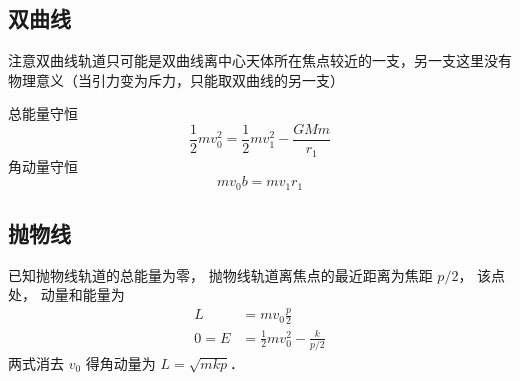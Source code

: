 \subsection{双曲线}
注意双曲线轨道只可能是双曲线离中心天体所在焦点较近的一支，另一支这里没有物理意义（当引力变为斥力，只能取双曲线的另一支）

总能量守恒
\begin{equation}
\frac12 mv_0^2 = \frac12 mv_1^2 - \frac{GMm}{r_1}
\end{equation}
角动量守恒
\begin{equation}
m v_0 b = m v_1 r_1
\end{equation}

\subsection{抛物线}
已知抛物线轨道的总能量为零， 抛物线轨道离焦点的最近距离为焦距 $p/2$， 该点处， 动量和能量为
\begin{align}
L &= mv_0 \frac p2\\
0 = E &= \frac 12 mv_0^2 - \frac{k}{p/2}
\end{align}
两式消去 $v_0$ 得角动量为 $L = \sqrt{mkp}$．